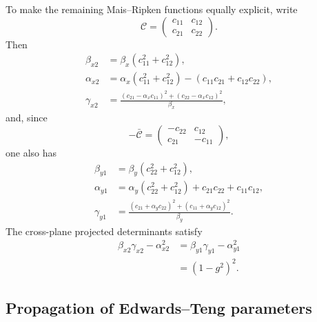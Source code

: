 To make the remaining Mais--Ripken functions equally explicit, write
\begin{equation}
 \mathcal C=
 \begin{pmatrix}
  c_{11}&c_{12}\\c_{21}&c_{22}
 \end{pmatrix}.
 \label{eq:c-components}
\end{equation}
Then
\begin{align}
 \beta_{x2}
 &=\beta_x(c_{11}^2+c_{12}^2),
 \label{eq:betax2-et}\\
 \alpha_{x2}
 &=\alpha_x(c_{11}^2+c_{12}^2)
   -(c_{11}c_{21}+c_{12}c_{22}),
 \label{eq:alphax2-et}\\
 \gamma_{x2}
 &=\frac{
  (c_{21}-\alpha_xc_{11})^2
  +(c_{22}-\alpha_xc_{12})^2
 }{\beta_x},
 \label{eq:gammax2-et}
\end{align}
and, since
\begin{equation}
 -\bar{\mathcal C}
 =
 \begin{pmatrix}
  -c_{22}&c_{12}\\
  c_{21}&-c_{11}
 \end{pmatrix},
\end{equation}
one also has
\begin{align}
 \beta_{y1}
 &=\beta_y(c_{22}^2+c_{12}^2),
 \label{eq:betay1-et}\\
 \alpha_{y1}
 &=\alpha_y(c_{22}^2+c_{12}^2)
   +c_{21}c_{22}+c_{11}c_{12},
 \label{eq:alphay1-et}\\
 \gamma_{y1}
 &=\frac{
  (c_{21}+\alpha_yc_{22})^2
  +(c_{11}+\alpha_yc_{12})^2
 }{\beta_y}.
 \label{eq:gammay1-et}
\end{align}
The cross-plane projected determinants satisfy
\begin{equation}
 \begin{aligned}
 \beta_{x2}\gamma_{x2}-\alpha_{x2}^2
 &=\beta_{y1}\gamma_{y1}-\alpha_{y1}^2\\
 &=(1-g^2)^2.
 \end{aligned}
 \label{eq:cross-determinants}
\end{equation}

\subsection{Propagation of Edwards--Teng parameters}
\label{sec:et-propagation}


